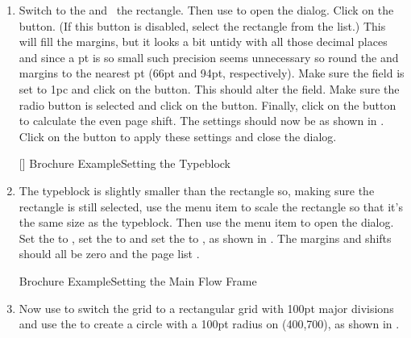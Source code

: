 \begin{enumerate}
[]
{}
{Brochure Example\dash Draw a Rectangle}

\item Switch to the  and \select\ the rectangle. Then
use  to open the
 dialog. Click on the
 button. (If this button
is disabled, select the rectangle from the list.) This will fill the margins, but it looks a bit untidy
with all those decimal places and since a \gls{pt} is so small such
precision seems unnecessary so round the
 and
 margins to the nearest
\gls{pt} (66\gls*{pt} and 94\gls*{pt}, respectively). Make sure
the  field is set to
1pc and click on the  button.
This should alter the  field.
Make sure the  radio button
is selected and click on the
 button. Finally, click on
the  button to calculate
the even page shift. The settings should now be as shown in
. Click on the  button to apply these
settings and close the dialog.

[]
{}
{Brochure Example\dash Setting the Typeblock}

\item The \gls{typeblock} is slightly smaller than the rectangle so,
making sure the rectangle is still selected, use the menu item
 to scale the rectangle so
that it's the same size as the \gls{typeblock}.  Then use the
 menu item to open the
 dialog. Set the  to
, set the  to
 and set the  to
, as shown in
. The margins and shifts should all be zero
and the page list .

{}
{Brochure Example\dash Setting the Main Flow Frame}

\item Now use  to switch the grid to a
rectangular grid with 100\gls{pt} major divisions and use the
 to create a circle with a 100\gls*{pt} radius
 on (400,700), as shown in
.


\end{enumerate}
